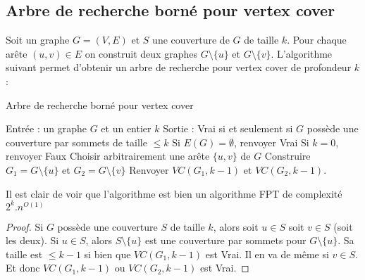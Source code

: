 \documentclass[a4paper, 12pt]{article}
\begin{document}
\subsection{Arbre de recherche borné pour vertex cover}
Soit un graphe $G=(V,E)$ et $S$ une couverture de $G$ de taille $k$. Pour chaque arête $(u,v) \in E$ on construit deux graphes $G \setminus \lbrace u \rbrace $ et $G \setminus \lbrace v \rbrace $. L'algorithme suivant permet d'obtenir un arbre de recherche pour vertex cover de profondeur $k$:
\begin{center}
\begin{algorithm}[h!]
\caption{Arbre de recherche borné pour vertex cover}\label{algo_unification}
\begin{algorithmic}[1]
\STATE Entrée : un graphe $G$ et un entier $k$
\STATE Sortie : Vrai si et seulement si $G$ possède une couverture par sommets de taille $\leqslant k $
\STATE Si $E(G) = \emptyset$, renvoyer Vrai
\STATE Si $k = 0$, renvoyer Faux
\STATE Choisir arbitrairement une arête $\lbrace u,v \rbrace$ de $G$
\STATE Construire $G_{1} = G \setminus \lbrace u \rbrace$ et $G_{2} = G \setminus \lbrace v \rbrace$
\STATE Renvoyer $VC (G_{1},k - 1)$ et $VC(G_{2},k - 1)$.
\end{algorithmic}
\end{algorithm}
\end{center}
Il est clair de voir que l'algorithme est bien un algorithme FPT de complexité $2^{k} .n^{O(1)}$
\begin{proof}
Si $G$ possède une couverture $S$ de taille $k$, alors soit $u \in S$ soit $v \in S$ (soit les deux).
Si $u \in S$, alors $S \setminus \lbrace u \rbrace$ est une couverture par sommets pour $G \setminus \lbrace u \rbrace$. Sa taille est $\leqslant k-1$ si bien que $VC(G_{1},k-1)$ est Vrai. Il en va de même si $v \in S$. Et donc $VC(G_{1},k-1)$ ou $VC(G_{2},k-1)$ est Vrai.
\end{proof}
\end{document}
